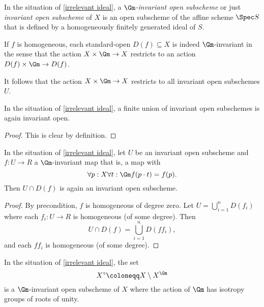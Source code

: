 \begin{definition}
  In the situation of \cref{irrelevant ideal}, a \emph{$\Gm$-invariant
    open subscheme} or just \emph{invariant open subscheme} of $X$ is
  an open subscheme of the affine scheme $\Spec S$ that is defined by
  a homogeneously finitely generated ideal of $S$.
\end{definition}

\begin{remark}
  If $f$ is homogeneous, each standard-open $D(f) \subseteq X$ is
  indeed $\Gm$-invariant in the sense that the action $X \times \Gm
  \to X$ restricts to an action $D(f) \times \Gm \to D(f)$.

  It follows that the action $X \times \Gm \to X$ restricts to all
  invariant open subschemes $U$.
\end{remark}

\begin{lemma}\label{finite invariant union}
  In the situation of \cref{irrelevant ideal}, a finite union of
  invariant open subschemes is again invariant open.
\end{lemma}

\begin{proof}
  This is clear by definition.
\end{proof}

\begin{lemma}\label{open subset of invariant open}
  In the situation of \cref{irrelevant ideal}, let $U$ be an invariant
  open subscheme and $f\colon U \to R$ a $\Gm$-invariant map that is,
  a map with
  \begin{equation*}
    \forall p: X \forall t: \Gm f(p \cdot t) = f(p).
  \end{equation*}
  Then $U \cap D(f)$ is again an invariant open subscheme.
\end{lemma}

\begin{proof}
  By precondition, $f$ is homogeneous of degree zero. Let $U =
  \bigcup_{i = 1}^n D(f_i)$ where each $f_i\colon U \to R$ is
  homogeneous (of some degree). Then
  \begin{equation*}
    U \cap D(f) = \bigcup_{i = 1}^n D(f f_i),
  \end{equation*}
  and each $f f_i$ is homogeneous (of some degree).
\end{proof}

\begin{proposition}
  In the situation of \cref{irrelevant ideal}, the set
  \begin{equation*}
    X^\circ \coloneqq X \setminus X^{\Gm}
  \end{equation*}
  is a $\Gm$-invariant open subscheme of $X$ where the action of $\Gm$ has
  isotropy groups of roots of unity.
\end{proposition}

